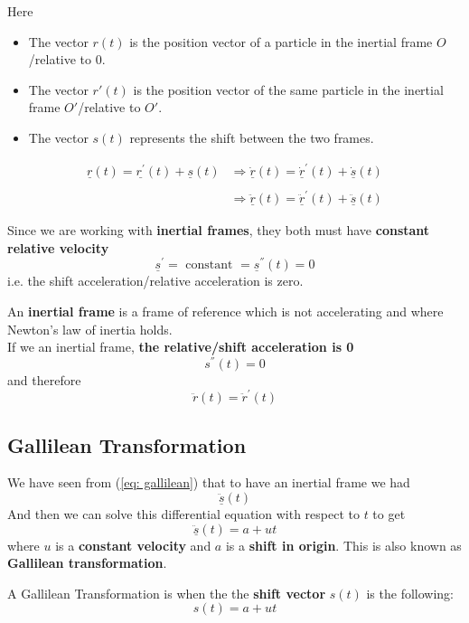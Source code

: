 \begin{mycenter}
\begin{tikzpicture}[x=0.75pt,y=0.75pt,yscale=-1,xscale=1]
	\end{tikzpicture}

\end{mycenter}

Here
\begin{itemize}
	\item The vector $r(t)$ is the position vector of a particle in the inertial frame $O$/relative to $0$.
	\item The vector $r'(t)$ is the position vector of the same particle in the inertial frame $O'$/relative to $O'$.
	\item The vector $s(t)$ represents the shift between the two frames.
\end{itemize}

$$\begin{aligned}\underline{r}(t) = \underline{r^{'}}(t) + \underline{s}(t) & \Rightarrow \underline{\dot{r}}(t) = \underline{\dot{r}}^{'}(t) + \underline{\dot{s}}(t)    \\ \\
                                                                          & \Rightarrow \underline{\ddot{r}}(t) = \underline{\ddot{r}}^{'}(t) + \underline{\ddot{s}}(t)\end{aligned}$$

\clearpage
Since we are working with {\bf inertial frames}, they both must have {\bf constant relative velocity}
$$\underline{s}^{'} = \text{ constant } = \underline{s}^{''}\left(t  \right) = 0$$
i.e. the shift acceleration/relative acceleration is zero.

\begin{definition}
	An {\bf inertial frame} is a frame of reference which is not accelerating and where Newton's law of inertia holds. \\
	If we an inertial frame, {\bf the relative/shift acceleration is 0}
	\begin{equation}
		s^{''}(t) = 0 \tag{$*$} \label{eq: gallilean}
	\end{equation}
	and therefore
	$$\ddot{r}(t) = \ddot{r}^{'}(t)$$

\end{definition}

\subsection{Gallilean Transformation}
We have seen from (\ref{eq: gallilean}) that to have an inertial frame we had
$$\underline{\ddot{s}}\left(t  \right) $$
And then we can solve this differential equation with respect to $t$ to get
$$\underline{\ddot{s}}\left(t  \right) = a + ut$$
where $u$ is a {\bf constant velocity} and $a$ is a {\bf shift in origin}. This is also known as {\bf Gallilean transformation}.

\begin{definition}
	A Gallilean Transformation is when the the {\bf shift vector} $s(t)$ is the following:
	\begin{equation}
		\label{eq: gallilean-transformation}
		s(t) = a + ut
	\end{equation}
\end{definition}
